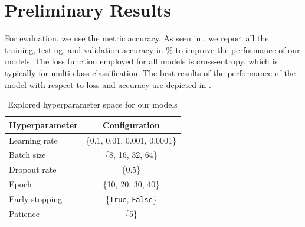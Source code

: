 \section{Preliminary Results}
\label{sec:result}

For evaluation, we use the metric accuracy. 
As seen in , 
we report all the training, testing, and validation accuracy in \% to improve the performance of our models. 
The loss function employed for all models is cross-entropy, which is typically for multi-class classification. 
The best results of the performance of the model with respect to loss and accuracy are depicted in .

\begin{table}
  \centering
  \caption{Accuracy (\%) for different models in our experiments}
  \label{tab:model}
\end{table}

\begin{table}
    \centering
    \begin{tabular}{@{}lc@{}}
      \toprule
      Hyperparameter & Configuration \\
      \midrule
      Learning rate & \{0.1, 0.01, 0.001, 0.0001\}  \\
      Batch size & \{8, 16, 32, 64\} \\
      Dropout rate & \{0.5\} \\
      Epoch & \{10, 20, 30, 40\} \\
      Early stopping & \{\texttt{True}, \texttt{False}\} \\
      Patience & \{5\} \\
      \bottomrule
    \end{tabular}
    \caption{Explored hyperparameter space for our models}
    \label{tab:hyper}
\end{table}

